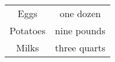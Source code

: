 \begin{center}
\begin{tabular}{|c|c|}
\hline
Eggs & one dozen \\ 
Potatoes & nine pounds \\ 
Milks & three quarts \\ 
\hline
\end{tabular}
\end{center}

